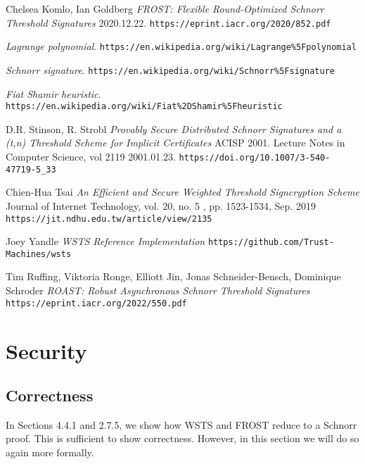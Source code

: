 \documentclass{article}
\begin{document}
\begin{thebibliography}{7}

  Chelsea Komlo, Ian Goldberg
  \emph{FROST: Flexible Round-Optimized Schnorr Threshold Signatures} 2020.12.22.
  \texttt{https://eprint.iacr.org/2020/852.pdf}

  \emph{Lagrange polynomial}.
  \texttt{https://en.wikipedia.org/wiki/Lagrange\%5Fpolynomial}

  \emph{Schnorr signature}.
  \texttt{https://en.wikipedia.org/wiki/Schnorr\%5Fsignature}

  \emph{Fiat Shamir heuristic}.
  \texttt{https://en.wikipedia.org/wiki/Fiat\%2DShamir\%5Fheuristic}

  D.R. Stinson, R. Strobl
  \emph{Provably Secure Distributed Schnorr Signatures and a (t,n) Threshold Scheme for Implicit Certificates} ACISP 2001. Lecture Notes in Computer Science, vol 2119 2001.01.23.
  \texttt{https://doi.org/10.1007/3-540-47719-5\_33}

  Chien-Hua Tsai
  \emph{An Efficient and Secure Weighted Threshold Signcryption Scheme} Journal of Internet Technology, vol. 20, no. 5 , pp. 1523-1534, Sep. 2019
  \texttt{https://jit.ndhu.edu.tw/article/view/2135}

  Joey Yandle
  \emph{WSTS Reference Implementation}
  \texttt{https://github.com/Trust-Machines/wsts}

  Tim Ruffing, Viktoria Ronge, Elliott Jin, Jonas Schneider-Bensch, Dominique Schroder
  \emph{ROAST: Robust Asynchronous Schnorr Threshold Signatures} 
  \texttt{https://eprint.iacr.org/2022/550.pdf}

\end{thebibliography}

\appendix
\newpage
\onecolumn

\section{
  Security
}

\subsection{
  Correctness
}

In Sections 4.4.1 and 2.7.5, we show how WSTS and FROST reduce to a Schnorr proof.  This is sufficient to show correctness.  However, in this section we will do so again more formally.
\end{document}
